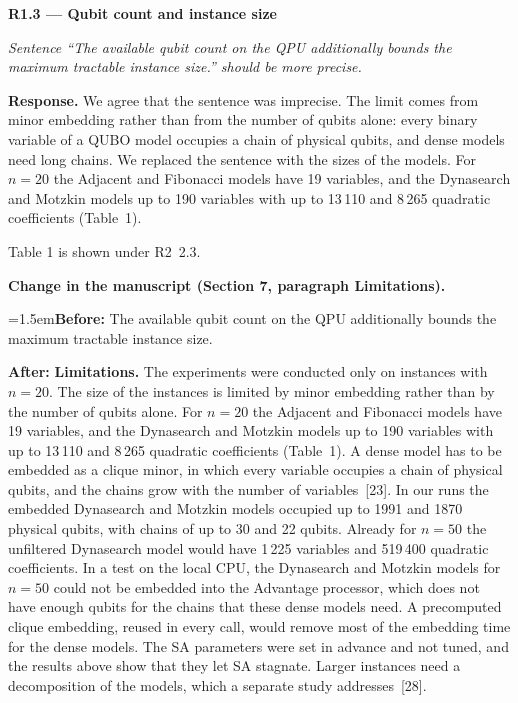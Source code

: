 \documentclass[12pt]{article}
\newenvironment{rc}[1]{\par\medskip\noindent\textbf{#1}\par\nopagebreak\noindent\itshape\renewcommand{\emph}[1]{\textbf{##1}}\ignorespaces}{\par}
\newcommand{\answer}[1]{\par\smallskip\noindent\textbf{Response.} #1\par}
\newcommand{\change}[3]{\par\smallskip\noindent\textbf{Change in the manuscript (#1).}\par
  {\leftskip=1.5em\noindent\textbf{Before:} #2\par\noindent\textbf{After:} #3\par}}
\begin{document}
\begin{rc}{R1.3 --- Qubit count and instance size}
Sentence ``The available qubit count on the QPU additionally bounds the maximum tractable instance size.'' should be more precise.
\end{rc}
\answer{We agree that the sentence was imprecise. The limit comes from minor embedding rather than from the number of qubits alone: every binary variable of a QUBO model occupies a chain of physical qubits, and dense models need long chains. We replaced the sentence with the sizes of the models. For $n=20$ the Adjacent and Fibonacci models have 19 variables, and the Dynasearch and Motzkin models up to 190 variables with up to 13\,110 and 8\,265 quadratic coefficients (Table~1).}
Table 1 is shown under R2~2.3.
\change{Section 7, paragraph Limitations}{The available qubit count on the QPU additionally bounds the maximum tractable instance size.}{\textbf{Limitations.} The experiments were conducted only on instances with $n=20$. The size of the instances is limited by minor embedding rather than by the number of qubits alone. For $n=20$ the Adjacent and Fibonacci models have 19 variables, and the Dynasearch and Motzkin models up to 190 variables with up to 13\,110 and 8\,265 quadratic coefficients (Table~1). A dense model has to be embedded as a clique minor, in which every variable occupies a chain of physical qubits, and the chains grow with the number of variables~[23]. In our runs the embedded Dynasearch and Motzkin models occupied up to 1991 and 1870 physical qubits, with chains of up to 30 and 22 qubits. Already for $n=50$ the unfiltered Dynasearch model would have 1\,225 variables and 519\,400 quadratic coefficients. In a test on the local CPU, the Dynasearch and Motzkin models for $n=50$ could not be embedded into the Advantage processor, which does not have enough qubits for the chains that these dense models need. A precomputed clique embedding, reused in every call, would remove most of the embedding time for the dense models. The SA parameters were set in advance and not tuned, and the results above show that they let SA stagnate. Larger instances need a decomposition of the models, which a separate study addresses~[28].}
\end{document}
